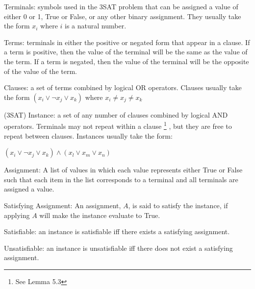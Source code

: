 \documentclass[manuscript]{acmart}
\begin{document}
    \begin{definition}
        Terminals: symbols used in the 3SAT problem that can be assigned a value
        of either 0 or 1, True or False, or any other binary assignment. They usually
        take the form $x_i$ where $i$ is a natural number.
    \end{definition}
    \begin{definition}
        Terms: terminals in either the positive or negated form that appear in a clause.
        If a term is positive, then the value of the terminal will be the 
        same as the value of the term. If a term is negated, then the value
        of the terminal will be the opposite of the value of the term.
    \end{definition}
    \begin{definition}
        Clauses: a set of terms combined by logical OR operators.
        Clauses usually take the form 
        $(x_i \lor \neg x_j \lor x_k)$ where $x_i \neq x_j \neq x_k$
    \end{definition}
    \begin{definition}
        (3SAT) Instance: a set of any number of clauses combined by logical
        AND operators. Terminals may not repeat within a clause
        \footnote{See Lemma 5.3}
        , but they are free to repeat between clauses. 
        Instances usually take the form:

        $(x_i \lor \neg x_j \lor x_k) \land (x_l \lor x_m \lor x_n)$
    \end{definition}
    \begin{definition}
        Assignment: A list of values in which each value represents either True
        or False such that each item in the list corresponds to a terminal and 
        all terminals are assigned a value.
    \end{definition}
    \begin{definition}
        Satisfying Assignment: An assignment, $A$, is said to satisfy the instance, 
        if applying $A$ will make the instance evaluate to True.
    \end{definition}
    \begin{definition}
        Satisfiable: an instance is satisfiable iff there exists a satisfying assignment.
    \end{definition}
    \begin{definition}
        Unsatisfiable: an instance is unsatisfiable iff there does not exist a satisfying assignment.
    \end{definition}
\end{document}
